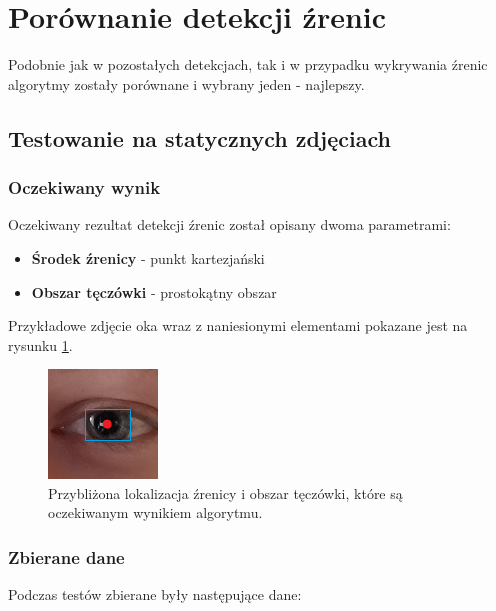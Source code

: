 \newpage
\section{Porównanie detekcji źrenic}

Podobnie jak w pozostałych detekcjach, tak i w przypadku wykrywania źrenic algorytmy zostały porównane i wybrany jeden - najlepszy.

\subsection{Testowanie na statycznych zdjęciach}

\subsubsection{Oczekiwany wynik}

Oczekiwany rezultat detekcji źrenic został opisany dwoma parametrami:
\begin{itemize}
    \item \textbf{Środek źrenicy} - punkt kartezjański
    \item \textbf{Obszar tęczówki} - prostokątny obszar 
\end{itemize}

Przykładowe zdjęcie oka wraz z naniesionymi elementami pokazane jest na rysunku \ref{fig:expected_pupil}.


\begin{figure}[!h]
    \begin{center}
        \includegraphics[scale=1.0]{img/pupil_section/pupil_expected.png}
        \caption{Przybliżona lokalizacja źrenicy i obszar tęczówki, które są oczekiwanym wynikiem algorytmu.}
        \label{fig:expected_pupil}
    \end{center}
\end{figure}

\subsubsection{Zbierane dane}

Podczas testów zbierane były następujące dane:


